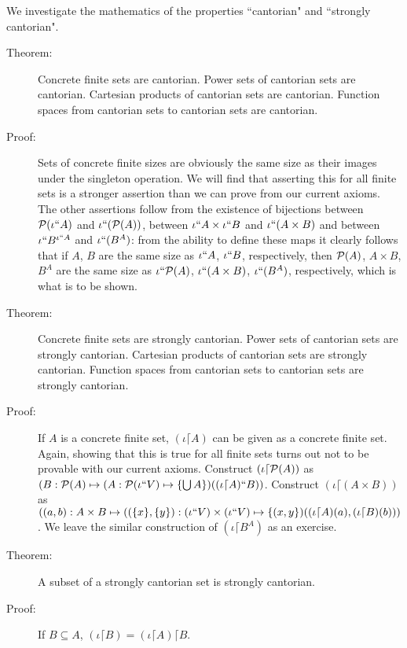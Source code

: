 \documentclass[12pt]{book}
\begin{document}
We investigate the mathematics of the properties ``cantorian" and ``strongly cantorian".

\begin{description}

\item[Theorem:]  Concrete finite sets are cantorian.  Power sets of cantorian sets are cantorian.  Cartesian products of cantorian sets are cantorian.  Function spaces from cantorian sets to cantorian sets are cantorian.


\item[Proof:]  Sets of concrete finite sizes are obviously the same size as their images under the singleton operation.  We will find that asserting this for all finite sets is a stronger assertion than we can prove from our current axioms.  The other assertions follow
from the existence of bijections between ${\cal P}(\iota``A)$ and $\iota``({\cal P}(A))$, between $\iota``A \times \iota``B$ and $\iota``(A \times B)$ and between $\iota``B^{\iota``A}$ and $\iota``(B^A)$:  from the ability to define these maps it clearly follows
that if $A$, $B$ are the same size as $\iota``A$, $\iota``B$, respectively, then ${\cal P}(A)$, $A \times B$, $B^A$ are the same size as  $\iota``{\cal P}(A)$, $\iota``(A \times B)$, $\iota``(B^A)$, respectively, which is what is to be shown.

\item[Theorem:]  Concrete finite sets are strongly cantorian.  Power sets of cantorian sets are strongly cantorian.  Cartesian products of cantorian sets are strongly cantorian.  Function spaces from cantorian sets to cantorian sets are strongly cantorian.

\item[Proof:]  If $A$ is a concrete finite set, $(\iota \lceil A)$ can be given as a concrete finite set.  Again, showing that this is true for all finite sets turns out not to be provable with our current axioms.  Construct $(\iota\lceil {\cal P}(A))$ as $(B:{\cal P}(A) \mapsto (A : {\cal P}(\iota``V) \mapsto \{\bigcup A\})((\iota \lceil A)``B))$.  Construct $(\iota\lceil(A \times B))$ as $((a,b): A \times B \mapsto ((\{x\},\{y\}):(\iota``V) \times (\iota``V) \mapsto \{(x,y\})((\iota\lceil A)(a),(\iota\lceil B)(b)))$.  We leave the similar construction of $(\iota \lceil B^A)$ as an exercise.

\item[Theorem:]  A subset of a strongly cantorian set is strongly cantorian.

\item[Proof:]  If $B \subseteq A$, $(\iota \lceil B) = (\iota \lceil A) \lceil B$.

\end{description}
\end{document}
